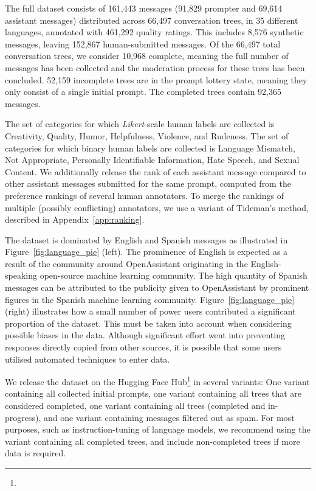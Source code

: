The full dataset consists of 161,443 messages (91,829 prompter and 69,614 assistant messages) distributed across 66,497 conversation trees, in 35 different languages, annotated with 461,292 quality ratings. This includes 8,576 synthetic messages, leaving 152,867 human-submitted messages. Of the 66,497 total conversation trees, we consider 10,968 complete, meaning the full number of messages has been collected and the moderation process for these trees has been concluded. 52,159 incomplete trees are in the prompt lottery state, meaning they only consist of a single initial prompt. The completed trees contain 92,365 messages.

The set of categories for which \textit{Likert}-scale human labels are collected is Creativity, Quality, Humor, Helpfulness, Violence, and Rudeness. The set of categories for which binary human labels are collected is Language Mismatch, Not Appropriate, Personally Identifiable Information, Hate Speech, and Sexual Content. We additionally release the rank of each assistant message compared to other assistant messages submitted for the same prompt, computed from the preference rankings of several human annotators. To merge the rankings of multiple (possibly conflicting) annotators, we use a variant of Tideman's method, described in Appendix~\ref{app:ranking}.

The dataset is dominated by English and Spanish messages as illustrated in Figure~\ref{fig:language_pie} (left). The prominence of English is expected as a result of the community around OpenAssistant originating in the English-speaking open-source machine learning community. The high quantity of Spanish messages can be attributed to the publicity given to OpenAssistant by prominent figures in the Spanish machine learning community.
Figure~\ref{fig:language_pie} (right) illustrates how a small number of power users contributed a significant proportion of the dataset. This must be taken into account when considering possible biases in the data. Although significant effort went into preventing responses directly copied from other sources, it is possible that some users utilised automated techniques to enter data.

We release the dataset on the Hugging Face Hub\footnote{\data} in several variants: One variant containing all collected initial prompts, one variant containing all trees that are considered completed, one variant containing all trees (completed and in-progress), and one variant containing messages filtered out as spam. For most purposes, such as instruction-tuning of language models, we recommend using the variant containing all completed trees, and include non-completed trees if more data is required.


